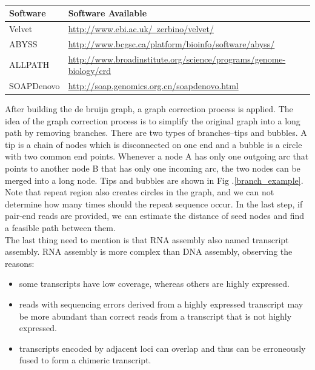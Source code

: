 \documentclass{article}
\begin{document}
\begin{table}[ht]
\begin{center}
\caption{}\label{links_of_assemblers}
\begin{tabular}{l|l}
\hline
Software &Software Available\\
\hline
Velvet &\href{http://www.ebi.ac.uk/~zerbino/velvet/}{http://www.ebi.ac.uk/~zerbino/velvet/}\\
\hline
ABYSS &\href{http://www.bcgsc.ca/platform/bioinfo/software/abyss/}{http://www.bcgsc.ca/platform/bioinfo/software/abyss/}\\
\hline
ALLPATH &\href{http://www.broadinstitute.org/science/programs/genome-biology/crd}{http://www.broadinstitute.org/science/programs/genome-biology/crd}\\
\hline
SOAPDenovo &\href{http://soap.genomics.org.cn/soapdenovo.html}{http://soap.genomics.org.cn/soapdenovo.html}\\
\hline
\end{tabular}
\end{center}
\end{table}
\noindent After building the de bruijn graph, a graph correction process is applied. The idea of the graph correction process is to simplify the original graph into a long path by removing branches. There are two types of branches--tips and bubbles. A tip is a chain of nodes which is disconnected on one end and a bubble is a circle with two common end points. Whenever a node A has only one outgoing arc that points to another node B that has only one incoming arc, the two nodes can be merged into a long node. Tips and bubbles are shown in Fig .\ref{branch_example}. Note that repeat region also creates circles in the graph, and we can not determine how many times should the repeat sequence occur. In the last step, if pair-end reads are provided, we can estimate the distance of seed nodes and find a feasible path between them.\\
The last thing need to mention is that RNA assembly also named transcript assembly. RNA assembly is more complex than DNA assembly, observing the reasons:
\begin{itemize}
 \item some transcripts have low coverage, whereas others are highly expressed.
 \item reads with sequencing errors derived from a highly expressed transcript may be more abundant than correct reads from a transcript that is not highly expressed.
 \item transcripts encoded by adjacent loci can overlap and thus can be erroneously fused to form a chimeric transcript.
\end{itemize}
\end{document}
